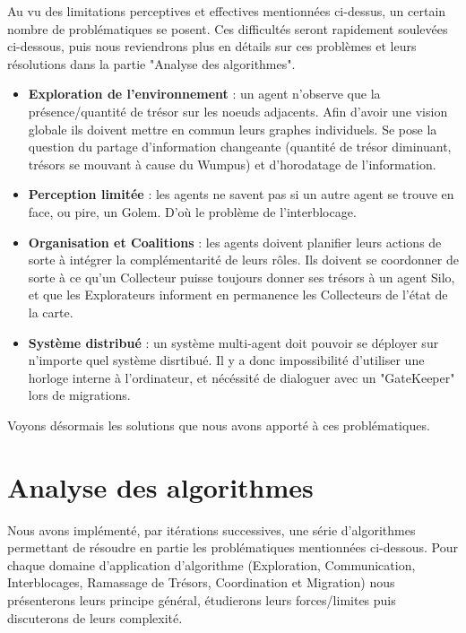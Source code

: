 \documentclass[a4paper, 10pt]{article}
\begin{document}
Au vu des limitations perceptives et effectives mentionnées ci-dessus, un certain nombre de problématiques se posent. Ces difficultés seront rapidement soulevées ci-dessous, puis nous reviendrons plus en détails sur ces problèmes et leurs résolutions dans la partie "Analyse des algorithmes".

\begin{itemize}
    \item \textbf{Exploration de l'environnement} : un agent n'observe que la présence/quantité de trésor sur les noeuds adjacents. Afin d'avoir une vision globale ils doivent mettre en commun leurs graphes individuels. Se pose la question du partage d'information changeante (quantité de trésor diminuant, trésors se mouvant à cause du Wumpus) et d'horodatage de l'information.
    \item \textbf{Perception limitée} : les agents ne savent pas si un autre agent se trouve en face, ou pire, un Golem. D'où le problème de l'interblocage.
    \item \textbf{Organisation et Coalitions} : les agents doivent planifier leurs actions de sorte à intégrer la complémentarité de leurs rôles. Ils doivent se coordonner de sorte à ce qu'un Collecteur puisse toujours donner ses trésors à un agent Silo, et que les Explorateurs informent en permanence les Collecteurs de l'état de la carte.
    \item \textbf{Système distribué} : un système multi-agent doit pouvoir se déployer sur n'importe quel système disrtibué. Il y a donc impossibilité d'utiliser une horloge interne à l'ordinateur, et nécéssité de dialoguer avec un "GateKeeper" lors de migrations.\\
    
\end{itemize}

\noindent Voyons désormais les solutions que nous avons apporté à ces problématiques.


\section{Analyse des algorithmes}

Nous avons implémenté, par itérations successives, une série d'algorithmes permettant de résoudre en partie les problématiques mentionnées ci-dessous. Pour chaque domaine d'application d'algorithme (Exploration, Communication, Interblocages, Ramassage de Trésors, Coordination et Migration) nous présenterons leurs principe général, étudierons leurs forces/limites puis discuterons de leurs complexité.
\end{document}
